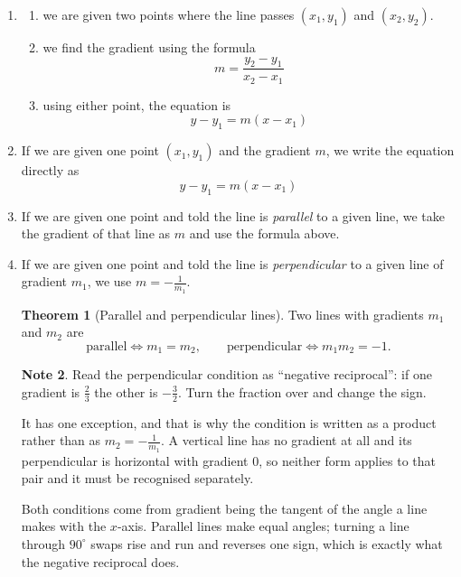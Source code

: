 \documentclass[11pt,a4paper]{article}
\theoremstyle{definition}
\newtheorem{thm}{Theorem}[section]
\newtheorem{note}[thm]{Note}
\begin{document}
\begin{enumerate}
\item 
\begin{enumerate}
      \item[i.] we are given two points where the line passes $(x_1,y_1)$ and $(x_2,y_2)$.
      
      \item[ii.] we find the gradient using the formula $$m = \frac{y_2 - y_1}{x_2 - x_1}$$
      
      \item[iii.] using either point, the equation is $$ y - y_1 = m(x - x_1)$$
\end{enumerate}

\item If we are given one point $(x_1,y_1)$ and the gradient $m$, we write the
equation directly as $$y- y_1 = m(x - x_1)$$

\item If we are given one point and told the line is \emph{parallel} to a given
line, we take the gradient of that line as $m$ and use the formula above.

\item If we are given one point and told the line is \emph{perpendicular} to a
given line of gradient $m_1$, we use $m=-\frac{1}{m_1}$.

\begin{thm}[Parallel and perpendicular lines]
Two lines with gradients $m_1$ and $m_2$ are
$$\text{parallel} \iff m_1=m_2,
\qquad \text{perpendicular} \iff m_1m_2=-1 .$$
\end{thm}

\begin{note}
Read the perpendicular condition as ``negative reciprocal'': if one gradient is
$\frac{2}{3}$ the other is $-\frac{3}{2}$. Turn the fraction over and change the
sign.

It has one exception, and that is why the condition is written as a product rather
than as $m_2=-\frac{1}{m_1}$. A vertical line has no gradient at all and its
perpendicular is horizontal with gradient $0$, so neither form applies to that
pair and it must be recognised separately.

Both conditions come from gradient being the tangent of the angle a line makes
with the $x$-axis. Parallel lines make equal angles; turning a line through
$90^{\circ}$ swaps rise and run and reverses one sign, which is exactly what the
negative reciprocal does.
\end{note}


\end{enumerate}
\end{document}
